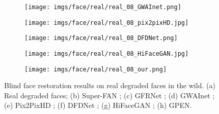 \documentclass[final]{cvpr}
\begin{document}
\begin{figure*}[t!]
\begin{subfigure}[t!]{.12\textwidth}
        \texttt{[image: imgs/face/real/real\_08\_GWAInet.png]}
        \vspace*{-5mm}
        \caption{}
    \end{subfigure}
    \begin{subfigure}[t!]{.12\textwidth}
        \texttt{[image: imgs/face/real/real\_08\_pix2pixHD.jpg]}
        \vspace*{-5mm}
        \caption{}
    \end{subfigure}
    \begin{subfigure}[t!]{.12\textwidth}
        \texttt{[image: imgs/face/real/real\_08\_DFDNet.png]}
        \vspace*{-5mm}
        \caption{}
    \end{subfigure}
    \begin{subfigure}[t!]{.12\textwidth}
        \texttt{[image: imgs/face/real/real\_08\_HiFaceGAN.jpg]}
        \vspace*{-5mm}
        \caption{}
    \end{subfigure}
    \begin{subfigure}[t!]{.12\textwidth}
        \texttt{[image: imgs/face/real/real\_08\_our.png]}
        \vspace*{-5mm}
        \caption{}
    \end{subfigure}
\vspace*{-5mm}
\caption{Blind face restoration results on real degraded faces in the wild. (a) Real degraded faces; (b) Super-FAN ; (c) GFRNet ; (d) GWAInet ; (e) Pix2PixHD ; (f) DFDNet ; (g) HiFaceGAN ; (h) GPEN.}
\label{fig:realcomp}
\vspace*{-3mm}
\end{figure*} 
\end{document}
